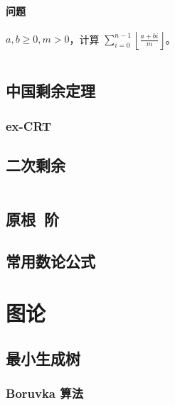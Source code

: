 \documentclass[a4paper, twoside]{article}
\begin{document}
\begin{multicols}{2}
					\paragraph{问题} $a,b \ge 0, m > 0$，计算 $\sum_{i = 0} ^ {n - 1} \left\lfloor \frac {a + bi} m \right\rfloor$。
					
					\inputminted{cpp}{../src/numbertheory/类欧.cpp}
			
			\subsection{中国剩余定理}
				

				\subsubsection{ex-CRT}
					
			
			\subsection{二次剩余}
				\inputminted{cpp}{../src/numbertheory/二次剩余.cpp}
			
			
			\subsection{原根~阶}
				
			
			\subsection{常用数论公式}
				
				
		\newpage
		\section{图论}

			\subsection{最小生成树}
				\subsubsection{Boruvka 算法}
					
				

\end{multicols}
\end{document}
